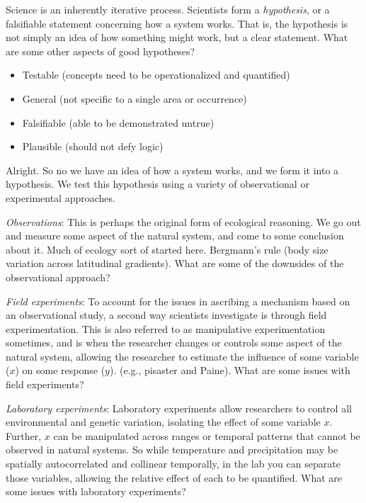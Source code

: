 \documentclass[12pt]{article}
\begin{document}
Science is an inherently iterative process. Scientists form a \textit{hypothesis}, or a falsifiable statement concerning how a system works. That is, the hypothesis is not simply an idea of how something might work, but a clear statement. What are some other aspects of good hypotheses?
\begin{itemize}

  \item Testable (concepts need to be operationalized and quantified)
  \item General (not specific to a single area or occurrence)
  \item Falsifiable (able to be demonstrated untrue)
  \item Plausible (should not defy logic)

\end{itemize}



Alright. So no we have an idea of how a system works, and we form it into a hypothesis. We test this hypothesis using a variety of observational or experimental approaches. 








\textit{Observations}: This is perhaps the original form of ecological reasoning. We go out and measure some aspect of the natural system, and come to some conclusion about it. Much of ecology sort of started here. Bergmann's rule (body size variation across latitudinal gradients). What are some of the downsides of the observational approach?




\textit{Field experiments}: To account for the issues in ascribing a mechanism based on an observational study, a second way scientists investigate is through field experimentation. This is also referred to as manipulative experimentation sometimes, and is when the researcher changes or controls some aspect of the natural system, allowing the researcher to estimate the influence of some variable ($x$) on some response ($y$). (e.g., pisaster and Paine). What are some issues with field experiments?





\textit{Laboratory experiments}: Laboratory experiments allow researchers to control all environmental and genetic variation, isolating the effect of some variable $x$. Further, $x$ can be manipulated across ranges or temporal patterns that cannot be observed in natural systems. So while temperature and precipitation may be spatially autocorrelated and collinear temporally, in the lab you can separate those variables, allowing the relative effect of each to be quantified. What are some issues with laboratory experiments?
\end{document}
